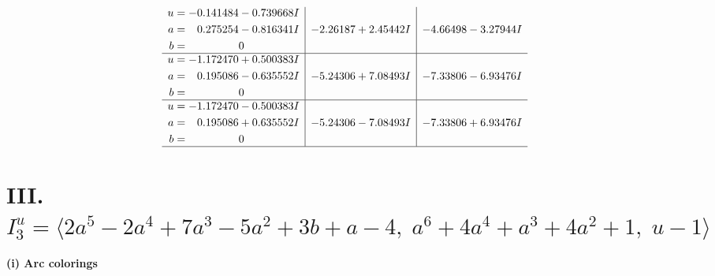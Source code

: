 \documentclass[1p]{elsarticle_modified}
\theoremstyle{definition}
\begin{document}
$$\begin{array}{c|c|c}
\begin{aligned}
u &= -0.141484 - 0.739668 I \\
a &= \phantom{-}0.275254 - 0.816341 I \\
b &= \phantom{-0.000000 } 0\end{aligned}
 & -2.26187 + 2.45442 I & -4.66498 - 3.27944 I \\ \hline\begin{aligned}
u &= -1.172470 + 0.500383 I \\
a &= \phantom{-}0.195086 - 0.635552 I \\
b &= \phantom{-0.000000 } 0\end{aligned}
 & -5.24306 + 7.08493 I & -7.33806 - 6.93476 I \\ \hline\begin{aligned}
u &= -1.172470 - 0.500383 I \\
a &= \phantom{-}0.195086 + 0.635552 I \\
b &= \phantom{-0.000000 } 0\end{aligned}
 & -5.24306 - 7.08493 I & -7.33806 + 6.93476 I\\
 \hline 
 \end{array}$$\newpage\newpage\renewcommand{\arraystretch}{1}
\centering \section*{III. $I^u_{3}= \langle 2 a^5-2 a^4+7 a^3-5 a^2+3 b+a-4,\;a^6+4 a^4+a^3+4 a^2+1,\;u-1 \rangle$}
\flushleft \textbf{(i) Arc colorings}\\
\end{document}
